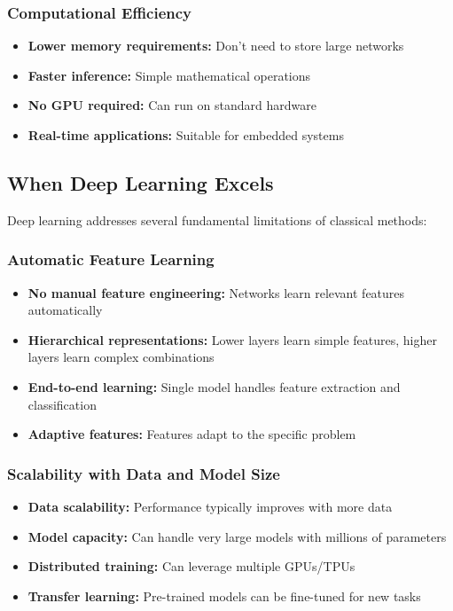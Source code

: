 \subsubsection{Computational Efficiency}
\begin{itemize}
    \item \textbf{Lower memory requirements:} Don't need to store large networks
    \item \textbf{Faster inference:} Simple mathematical operations
    \item \textbf{No GPU required:} Can run on standard hardware
    \item \textbf{Real-time applications:} Suitable for embedded systems
\end{itemize}

\subsection{When Deep Learning Excels}

Deep learning addresses several fundamental limitations of classical methods:

\subsubsection{Automatic Feature Learning}
\begin{itemize}
    \item \textbf{No manual feature engineering:} Networks learn relevant features automatically
    \item \textbf{Hierarchical representations:} Lower layers learn simple features, higher layers learn complex combinations
    \item \textbf{End-to-end learning:} Single model handles feature extraction and classification
    \item \textbf{Adaptive features:} Features adapt to the specific problem
\end{itemize}

\subsubsection{Scalability with Data and Model Size}
\begin{itemize}
    \item \textbf{Data scalability:} Performance typically improves with more data
    \item \textbf{Model capacity:} Can handle very large models with millions of parameters
    \item \textbf{Distributed training:} Can leverage multiple GPUs/TPUs
    \item \textbf{Transfer learning:} Pre-trained models can be fine-tuned for new tasks
\end{itemize}

